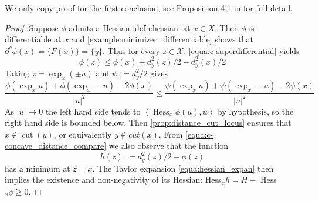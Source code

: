 We only copy proof for the first conclusion, see Proposition 4.1 in \cite{cordero2001riemannian} for full detail.
\begin{proof}
	Suppose \( \phi \) admits a Hessian \cref{defn:hessian} at \( x \in X \).
	Then \( \phi \) is differentiable at \( x \) and
	\cref{example:minimizer_differentiable} shows that \( \partial ^ { c } \phi ( x ) = \{ F ( x ) \} = \{ y \} \).
	Thus for every \( z \in \mathcal { X } \), \cref{equa:c-superdifferential} yields
	\begin{equation}
		\label{equa:c-concave_distance_compare}
		\phi ( z ) \leq \phi ( x ) + d _ { y } ^ { 2 } ( z ) / 2 - d _ { y } ^ { 2 } ( x ) / 2 \end{equation}
	Taking \( z = \exp _ { x } ( \pm u ) \) and \( \psi : = d _ { y } ^ { 2 } / 2 \) gives
	\[ \frac { \phi \left( \exp _ { x } u \right) + \phi \left( \exp _ { x } - u \right) - 2 \phi ( x ) } { | u | ^ { 2 } } \leq \frac { \psi \left( \exp _ { x } u \right) + \psi \left( \exp _ { x } - u \right) - 2 \psi ( x ) } { | u | ^ { 2 } } \]
	As \( | u | \rightarrow 0 \) the left hand side tends to \( \left\langle \operatorname { Hess } _ { x } \phi ( u ) , u \right\rangle \) by hypothesis, so the right hand side is bounded below.
	Then \cref{prop:distance_cut_locus} ensures that
	\( x \notin \operatorname { cut } ( y ) \), or equivalently \( y \notin c u t ( x ) \).
	From \cref{equa:c-concave_distance_compare} we also observe that the function
	\[ h ( z ) : = d _ { y } ^ { 2 } ( z ) / 2 - \phi ( z ) \]
	has a minimum at \( z = x \). The Taylor expansion \cref{equa:hessian_expan} then implies the
	existence and non-negativity of its Hessian: Hess\(_{ x } h = H - \) Hess\(_ { x } \phi \geq 0\).
\end{proof}

